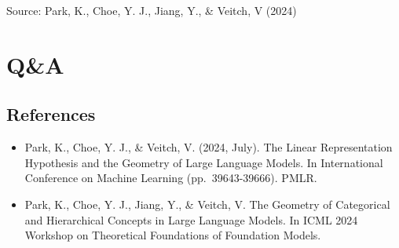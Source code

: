 \documentclass[
  letterpaper,
  DIV=11,
  numbers=noendperiod]{scrartcl}
\begin{document}
Source: Park, K., Choe, Y. J., Jiang, Y., \& Veitch, V (2024)

\section{Q\&A}\label{qa}

\subsection{References}\label{references}

\begin{itemize}
\item
  Park, K., Choe, Y. J., \& Veitch, V. (2024, July). The Linear
  Representation Hypothesis and the Geometry of Large Language Models.
  In International Conference on Machine Learning (pp.~39643-39666).
  PMLR.
\item
  Park, K., Choe, Y. J., Jiang, Y., \& Veitch, V. The Geometry of
  Categorical and Hierarchical Concepts in Large Language Models. In
  ICML 2024 Workshop on Theoretical Foundations of Foundation Models.
\end{itemize}
\end{document}
